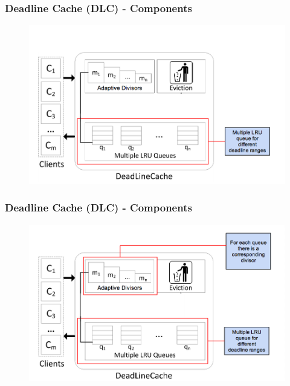 \documentclass{beamer}
\begin{document}
\begin{frame}
  \frametitle{Deadline Cache (DLC) - Components}
  \vspace{0.5 mm}
  \begin{figure}
    \begin{center}
      \centerline{\includegraphics[scale=0.33]{img/DLC_ARC_1.png}}
    \end{center}
  \end{figure}
\end{frame}

\begin{frame}
  \frametitle{Deadline Cache (DLC) - Components}
  \begin{figure}
    \begin{center}
      \centerline{\includegraphics[scale=0.33]{img/DLC_ARC_2.png}}
    \end{center}
  \end{figure}
\end{frame}
\end{document}
